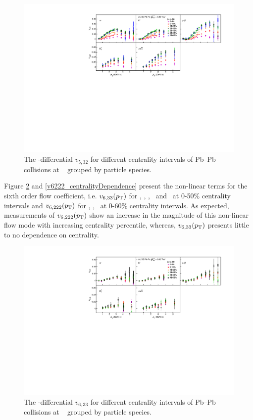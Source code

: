 \begin{figure}[!htb]
\begin{center}
\includegraphics[scale=0.82]{figures/results/All_v523_gap00_CentDep_PID2.pdf}
\end{center}
\caption{The \pT-differential $v_{5,32}$ for different centrality intervals of Pb--Pb collisions at \sNN~ grouped by particle species.}
\label{v523_centralityDependence}
\end{figure}

Figure \ref{v633_centralityDependence} and \ref{v6222_centralityDependence} present the non-linear terms for the sixth order flow coefficient, i.e. $v_{6,33}(p_{\rm{T}})$ for \pion, \kaon, \proton, \lambdas~and \Ks~at 0-50\% centrality intervals and $v_{6,222}(p_{\rm{T}})$ for \pion, \kaon, \proton~at 0-60\% centrality intervals. As expected, measurements of $v_{6,222}(p_{\rm{T}})$ show an increase in the magnitude of this non-linear flow mode with increasing centrality percentile, whereas, $v_{6,33}(p_{\rm{T}})$ presents little to no dependence on centrality. 

\begin{figure}[!htb]
\begin{center}
\includegraphics[scale=0.82]{figures/results/All_v633_gap00_CentDep_PID2.pdf}
\end{center}
\caption{The \pT-differential $v_{6,33}$ for different centrality intervals of Pb--Pb collisions at \sNN~ grouped by particle species.}
\label{v633_centralityDependence}
\end{figure}

